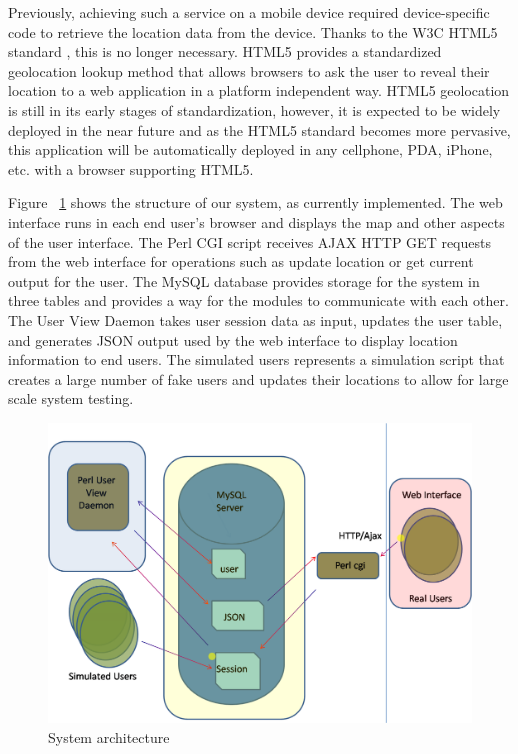 \documentclass[11pt]{article}
\begin{document}
Previously, achieving such a service on a mobile device required
device-specific code to retrieve the location data from the device. Thanks
to the W3C HTML5 standard \cite{html5}, this is no longer necessary. HTML5
provides a standardized geolocation lookup method that allows browsers
to ask the user to reveal their location to a web application in a
platform independent way. HTML5 geolocation is still in its early stages
of standardization, however, it is expected to be widely deployed in
the near future and as the HTML5 standard becomes more pervasive, this
application will be automatically deployed in any cellphone,
PDA, iPhone, etc. with a  browser supporting HTML5.

Figure ~\ref{fig:arch} shows the structure of our system, as currently implemented. 
The web interface runs in each end user's browser and displays the map
and other aspects of the user interface. The Perl CGI script receives AJAX
HTTP GET requests from the web interface for operations such as update
location or get current output for the user. The MySQL database provides
storage for the system in three tables and provides a way for the modules
to communicate with each other. The User View Daemon takes user session data
as input, updates the user table, and generates JSON output used by the web interface
to display location information to end users. The simulated users represents 
a simulation script that creates a large number of fake users and updates their locations
to allow for large scale system testing.
 
\begin{figure}[h]
\begin{center}
  \includegraphics[scale=0.5]{sysarch.png}
\caption{System architecture}
\label{fig:arch} 
\end{center}
\end{figure}
\end{document}
